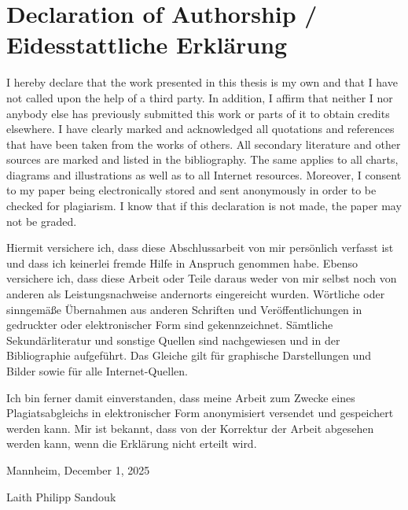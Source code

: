 \chapter*{\large Declaration of Authorship / Eidesstattliche Erkl\"{a}rung}
\pagestyle{empty}
I hereby declare that the work presented in this thesis is my own and that I have not called upon the help of a third party. In addition, I affirm that neither I nor anybody else has previously submitted this work or parts of it to obtain credits elsewhere. I have clearly marked and acknowledged all quotations and references that have been taken from the works of others. All secondary literature and other sources are marked and listed in the bibliography. The same applies to all charts, diagrams and illustrations as well as to all Internet resources. Moreover, I consent to my paper being electronically stored and sent anonymously in order to be checked for plagiarism. I know that if this declaration is not made, the paper may not be graded.

\vspace{-0.3cm}

\hrulefill

\vspace{-0.2cm}
Hiermit versichere ich, dass diese Abschlussarbeit von mir persönlich verfasst
ist und dass ich keinerlei fremde Hilfe in Anspruch genommen habe. Ebenso
versichere ich, dass diese Arbeit oder Teile daraus weder von mir selbst noch
von anderen als Leistungsnachweise andernorts eingereicht wurden. Wörtliche oder
sinn\-gemäße Übernahmen aus anderen Schriften und Veröffentlichungen in gedruckter
oder elektronischer Form sind gekennzeichnet. Sämtliche Sekundärliteratur und
sonstige Quellen sind nachgewiesen und in der Bibliographie aufgeführt. Das
Glei\-che gilt für graphische Darstellungen und Bilder sowie für alle
Internet-Quellen.

Ich bin ferner damit einverstanden, dass meine Arbeit zum Zwecke eines
Plagiatsabgleichs in elektronischer Form anonymisiert versendet und gespeichert
werden kann. Mir ist bekannt, dass von der Korrektur der Arbeit abgesehen werden
kann, wenn die Erklärung nicht erteilt wird.

\vspace{1.0cm}

Mannheim, December 1, 2025

\vspace{1.5cm}

Laith Philipp Sandouk
